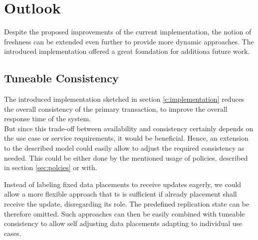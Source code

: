 \chapter{Outlook}
\label{c:outlook}


Despite the proposed improvements of the current implementation, the notion of freshness can be extended even further to provide more dynamic approaches.
The introduced implementation offered a great foundation for additiona future work.



\section{Tuneable Consistency}
The introduced implementation sketched in section \ref{c:implementation} reduces the overall consistency of the primary transaction,
to improve the overall response time of the system.\\ 
But since this trade-off between availability and consistency certainly depends on the use case or service requirements, it would be beneficial.
Hence, an extension to the described model could easily allow to adjust the required consistency as needed. 
This could be either done by the mentioned usage of policies, described in section \ref{sec:polcies} or with.

Instead of labeling fixed data placements to receive updates eagerly, we could allow a more flexible approach that ts is sufficient if already placement 
shall receive the update, disregarding its role. The predefined replication state can be therefore omitted. 
Such approaches can then be easily combined with tuneable consistency to allow self adjusting data placements  adapting to individual use cases.



